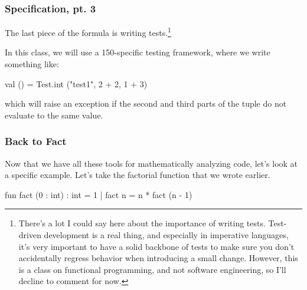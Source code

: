 \documentclass[aspectratio=169, handout]{beamer}
\begin{document}
\begin{frame}[fragile]
  \frametitle{Specification, pt. 3}

  The last piece of the formula is writing tests.\footnote{
    There's a lot I could say here about the importance
    of writing tests. Test-driven development is a real thing, and especially
    in imperative languages, it's very important to have a solid backbone
    of tests to make sure you don't accidentally regress behavior when
    introducing a small change. However, this is a class on functional
    programming, and not software engineering, so I'll decline to comment
    for now.\footnotemark
  }

  \pause
  \vspace{\fill}

  In this class, we will use a 150-specific testing framework, where
  we write something like:

  \begin{codeblock}
    val () = Test.int ("test1", 2 + 2, 1 + 3)
  \end{codeblock}
  which will raise an exception if the second and third parts of the
  tuple do not evaluate to the same value.

  \vspace{\fill}


\end{frame}

\begin{frame}[fragile]
  \frametitle{Back to Fact}

  Now that we have all these tools for mathematically analyzing
  code, let's look at a specific example. Let's take the factorial
  function that we wrote earlier.

  \vspace{\fill}

  \begin{codeblock}
    fun fact (0 : int) : int = 1
      | fact n = n * fact (n - 1)
  \end{codeblock}

  \pause
  \vspace{\fill}

\end{frame}
\end{document}
